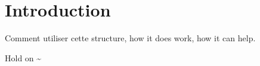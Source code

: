 \chapter{Introduction}

Comment utiliser cette structure, how it does work, how it can help.

Hold on \textasciitilde